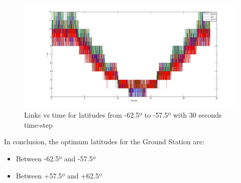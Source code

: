 \begin{figure}[H]
\begin{center}
\includegraphics[scale=0.30]{-625_-25_575_(30s)_lat.jpg}
\caption{Links vs time for latitudes from -62.5º to -57.5º with 30 seconds time-step}
\label{fig:lat8}
\end{center}
\end{figure}
In conclusion, the optimum latitudes for the Ground Station are:
\begin{itemize}
\item Between -62.5º and -57.5º
\item Between +57.5º and +62.5º
\end{itemize}

